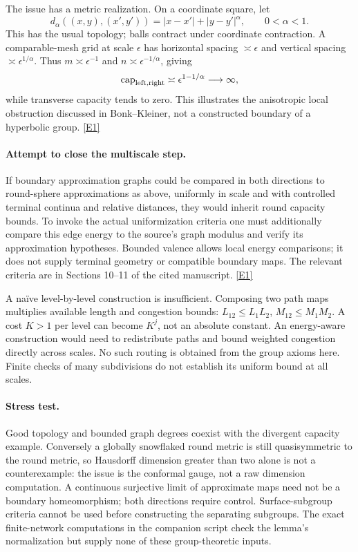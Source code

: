 \documentclass[11pt,a4paper]{article}
\newcommand{\eref}[2]{\hyperlink{extra:#1:#2}{[E#2]}}
\numberwithin{equation}{section}
\begin{document}
The issue has a metric realization. On a coordinate square, let
\[
 d_\alpha((x,y),(x',y'))=|x-x'|+|y-y'|^\alpha,
 \qquad 0<\alpha<1.
\]
This has the usual topology; balls contract under coordinate contraction.
A comparable-mesh grid at scale $\epsilon$ has horizontal spacing
$\asymp\epsilon$ and vertical spacing $\asymp\epsilon^{1/\alpha}$.
Thus $m\asymp\epsilon^{-1}$ and $n\asymp\epsilon^{-1/\alpha}$, giving
\[
 \operatorname{cap}_{\rm left,right}\asymp
 \epsilon^{1-1/\alpha}\longrightarrow\infty,
\]
while transverse capacity tends to zero. This illustrates the anisotropic
local obstruction discussed in Bonk--Kleiner, not a constructed boundary of
a hyperbolic group. \eref{statement}{1}

\paragraph{Attempt to close the multiscale step.}
If boundary approximation graphs could be compared in both directions to
round-sphere approximations as above, uniformly in scale and with controlled
terminal continua and relative distances, they would inherit round capacity
bounds. To invoke the actual uniformization criteria one must additionally
compare this edge energy to the source's graph modulus and verify its
approximation hypotheses. Bounded valence allows local energy comparisons;
it does not supply terminal geometry or compatible boundary maps. The
relevant criteria are in Sections 10--11 of the cited manuscript.
\eref{statement}{1}

A naïve level-by-level construction is insufficient. Composing two path
maps multiplies available length and congestion bounds:
$L_{12}\le L_1L_2$, $M_{12}\le M_1M_2$. A cost $K>1$ per level can become
$K^j$, not an absolute constant. An energy-aware construction would need
to redistribute paths and bound weighted congestion directly across scales.
No such routing is obtained from the group axioms here. Finite checks of
many subdivisions do not establish its uniform bound at all scales.

\paragraph{Stress test.}
Good topology and bounded graph degrees coexist with the divergent capacity
example. Conversely a globally snowflaked round metric is still
quasisymmetric to the round metric, so Hausdorff dimension greater than two
alone is not a counterexample: the issue is the conformal gauge, not a raw
dimension computation. A continuous surjective limit of approximate maps
need not be a boundary homeomorphism; both directions require control.
Surface-subgroup criteria cannot be used before constructing the separating
subgroups. The exact finite-network computations in the companion script
check the lemma's normalization but supply none of these group-theoretic
inputs.
\end{document}
